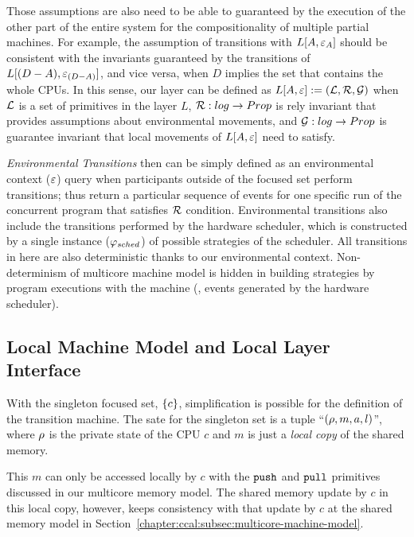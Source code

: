 Those assumptions are also need to be able to guaranteed by the execution of the other part of the entire system for 
the compositionality of multiple partial machines.
For example, the assumption of transitions with $L[A, {\varepsilon}_{A}]$ should be consistent with the invariants guaranteed by the transitions of $L[(D - A), {\varepsilon}_{(D-A)}]$, and vice versa, when $D$ implies the set that contains the whole CPUs.
In this sense, our layer can be defined as
$L[A, {\varepsilon}] := (\mathcal{L}, \mathcal{R},\mathcal{G})$ when $\mathcal{L}$ is a set of primitives in the layer $L$,
$\mathcal{R} : log \rightarrow Prop$ is  rely invariant that provides assumptions about  environmental movements,
and $\mathcal{G}: log \rightarrow Prop$ is guarantee invariant that local movements of $L[A, {\varepsilon}]$ need to satisfy.

\emph{Environmental Transitions} then can be simply defined as 
an environmental context (${\varepsilon}$) query when participants outside of the focused set perform transitions;
thus return a particular sequence of events for one specific run of the concurrent program 
that satisfies $\mathcal{R}$ condition.
Environmental transitions also include the transitions performed by 
the hardware scheduler, which is constructed by 
a single instance ($\varphi_{sched}$) of possible strategies of the scheduler.
All transitions in here are also deterministic thanks to our environmental context.
Non-determinism of multicore machine model is hidden in building strategies by
program executions with the machine (\eg, events generated by the hardware scheduler).

\subsection{Local Machine Model and Local Layer Interface}
\label{chapter:ccal:subsec:local-layer-interface}

With the singleton focused set, $\{c\}$, 
simplification is possible for the definition of the transition machine.
The sate for the singleton set is a tuple ``$(\rho, m, a, l)$'',
where $\rho$ is the private state of the CPU $c$
and $m$ is just a \emph{local copy} of the shared memory.


This $m$ can only be accessed locally by $c$ with the ${\mathrm{\texttt{push}}}$ and ${\mathrm{\texttt{pull}}}$ primitives discussed in our multicore memory model. 
The shared  memory update by $c$ in this local copy, however, 
keeps consistency with 
that update by $c$ at the shared memory model in
Section~\ref{chapter:ccal:subsec:multicore-machine-model}.



